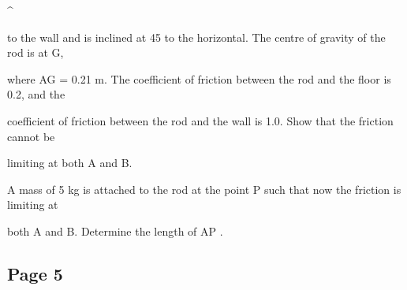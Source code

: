 \documentclass[12pt]{article}
\begin{document}
\begin{flushleft}
\textasciicircum{}\circ\par
to the wall and is inclined at 45 to the horizontal. The centre of gravity of the rod is at G,\par
where AG = 0.21 m. The coefficient of friction between the rod and the floor is 0.2, and the\par
coefficient of friction between the rod and the wall is 1.0. Show that the friction cannot be\par
limiting at both A and B.\par
A mass of 5 kg is attached to the rod at the point P such that now the friction is limiting at\par
both A and B. Determine the length of AP .\par
\end{flushleft}
\subsection*{Page 5}
\end{document}
